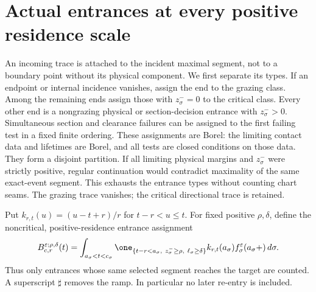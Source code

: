 \section{Actual entrances at every positive residence scale}
\label{sec:v94-entrances}
An incoming trace is attached to the incident maximal segment, not to
a boundary point without its physical component. We first separate its
types. If an endpoint or internal incidence vanishes, assign the end
to the grazing class. Among the remaining ends assign those with
$z_\sigma^-=0$ to the critical class. Every other end is a nongrazing
physical or section-decision entrance with $z_\sigma^->0$.
Simultaneous section and clearance failures can be assigned to the
first failing test in a fixed finite ordering. These assignments are
Borel: the limiting contact data and lifetimes are Borel, and all tests
are closed conditions on those data. They form a disjoint partition.
If all limiting physical margins and $z_\sigma^-$ were strictly
positive, regular continuation would contradict maximality of the
same exact-event segment. This exhausts the entrance types without
counting chart seams. The grazing trace vanishes; the critical
directional trace is retained.

Put $k_{r,t}(u)=(u-t+r)/r$ for $t-r<u\le t$. For fixed positive
$\rho,\delta$, define the noncritical, positive-residence entrance
assignment
\begin{equation}\label{eq:v94-entrance-assignment}
 B_{c,r}^{\varepsilon;\rho,\delta}(t)
 =\int_{a_\sigma<t<c_\sigma}
 \one_{\{t-r<a_\sigma,\ z_\sigma^-\ge\rho,\ \ell_\sigma\ge\delta\}}
          k_{r,t}(a_\sigma)f_\sigma^\varepsilon(a_\sigma+)\,d\sigma.
\end{equation}
Thus only entrances whose same selected segment reaches the target
are counted. A superscript $\sharp$ removes the ramp. In particular
no later re-entry is included.

